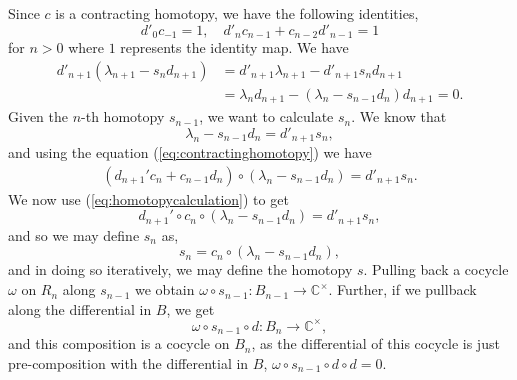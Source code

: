 \documentclass[11pt]{book}
\theoremstyle{Rem}
\theoremstyle{definition}
\numberwithin{equation}{section}
\newcommand\CC{\mathbb C}
\newcommand{\ra}\rightarrow
\begin{document}
Since $c$ is a contracting homotopy, we have the following identities, \begin{equation}\label{eq:contractinghomotopy}
	d'_0c_{-1} = 1, \quad d'_n c_{n-1} + c_{n-2}d'_{n-1} = 1
\end{equation} for $n>0$ where $1$ represents the identity map.
We have \begin{align}
	d'_{n+1} (\lambda_{n+1} - s_nd_{n+1})&= d'_{n+1}\lambda_{n+1}-d'_{n+1}s_nd_{n+1} \nonumber\\
	&= \lambda_nd_{n+1} - (\lambda_n - s_{n-1}d_n)d_{n+1}=0. \label{eq:homotopycalculation}
\end{align}
Given the $n$-th homotopy $s_{n-1}$, we want to calculate $s_{n}$. We know that \begin{equation}
	\lambda_n-s_{n-1}d_n = d'_{n+1}s_n,
\end{equation} and using the equation (\ref{eq:contractinghomotopy}) we have \begin{align}
	(d_{n+1}'c_n + c_{n-1}d_n)\circ( \lambda_n-s_{n-1}d_n )= d'_{n+1}s_n.
\end{align} We now use (\ref{eq:homotopycalculation}) to get \begin{equation}
	d_{n+1}'\circ c_n \circ ( \lambda_n-s_{n-1}d_n )= d'_{n+1}s_n,
\end{equation} and so we may define $s_n$ as, \begin{equation}
	 s_n = c_n \circ ( \lambda_n-s_{n-1}d_n ),
\end{equation}
and in doing so iteratively, we may define the homotopy $s$. Pulling back a cocycle $\omega$ on $R_n$ along $s_{n-1}$ we obtain $\omega\circ s_{n-1}: B_{n-1} \ra \CC^\times$. Further, if we pullback along the differential in $B$, we get \begin{equation}
	\omega\circ s_{n-1}\circ d: B_n\ra \CC^\times,
\end{equation}
and this composition is a cocycle on $B_n$, as the differential of this cocycle is just pre-composition with the differential in $B$, $\omega\circ s_{n-1}\circ d\circ d = 0$. 
\end{document}
